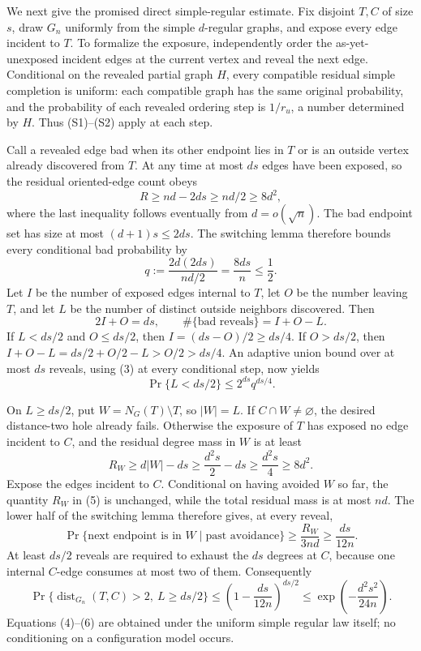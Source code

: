 We next give the promised direct simple-regular estimate.  Fix disjoint \(T,C\) of size \(s\), draw \(G_n\) uniformly from the simple \(d\)-regular graphs, and expose every edge incident to \(T\).  To formalize the exposure, independently order the as-yet-unexposed incident edges at the current vertex and reveal the next edge.  Conditional on the revealed partial graph \(H\), every compatible residual simple completion is uniform: each compatible graph has the same original probability, and the probability of each revealed ordering step is \(1/r_u\), a number determined by \(H\).  Thus (S1)--(S2) apply at each step.

Call a revealed edge bad when its other endpoint lies in \(T\) or is an outside vertex already discovered from \(T\).  At any time at most \(ds\) edges have been exposed, so the residual oriented-edge count obeys
\[
R\ge nd-2ds\ge nd/2\ge8d^2,
\]
where the last inequality follows eventually from \(d=o(\sqrt n)\).  The bad endpoint set has size at most \((d+1)s\le2ds\).  The switching lemma therefore bounds every conditional bad probability by
\[
q:=\frac{2d(2ds)}{nd/2}=\frac{8ds}{n}\le\frac12.
\tag{3}
\]
Let \(I\) be the number of exposed edges internal to \(T\), let \(O\) be the number leaving \(T\), and let \(L\) be the number of distinct outside neighbors discovered.  Then
\[
2I+O=ds,
\qquad
\#\{\text{bad reveals}\}=I+O-L.
\]
If \(L<ds/2\) and \(O\le ds/2\), then \(I=(ds-O)/2\ge ds/4\).  If \(O>ds/2\), then \(I+O-L=ds/2+O/2-L>O/2>ds/4\).  An adaptive union bound over at most \(ds\) reveals, using (3) at every conditional step, now yields
\[
\Pr\{L<ds/2\}
\le 2^{ds}q^{ds/4}.
\tag{4}
\]

On \(L\ge ds/2\), put \(W=N_G(T)\setminus T\), so \(|W|=L\).  If \(C\cap W\ne\varnothing\), the desired distance-two hole already fails.  Otherwise the exposure of \(T\) has exposed no edge incident to \(C\), and the residual degree mass in \(W\) is at least
\[
R_W\ge d|W|-ds\ge\frac{d^2s}{2}-ds\ge\frac{d^2s}{4}\ge8d^2.
\tag{5}
\]
Expose the edges incident to \(C\).  Conditional on having avoided \(W\) so far, the quantity \(R_W\) in (5) is unchanged, while the total residual mass is at most \(nd\).  The lower half of the switching lemma therefore gives, at every reveal,
\[
\Pr\{\text{next endpoint is in }W\mid\text{past avoidance}\}
\ge\frac{R_W}{3nd}\ge\frac{ds}{12n}.
\]
At least \(ds/2\) reveals are required to exhaust the \(ds\) degrees at \(C\), because one internal \(C\)-edge consumes at most two of them.  Consequently
\[
\Pr\{\operatorname{dist}_{G_n}(T,C)>2,\ L\ge ds/2\}
\le\left(1-\frac{ds}{12n}\right)^{ds/2}
\le\exp\!\left(-\frac{d^2s^2}{24n}\right).
\tag{6}
\]
Equations (4)--(6) are obtained under the uniform simple regular law itself; no conditioning on a configuration model occurs.

